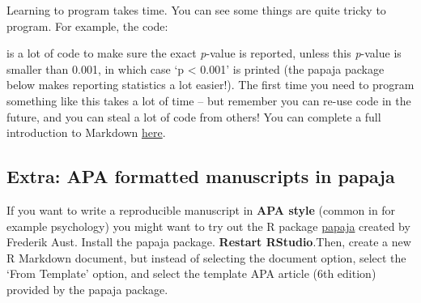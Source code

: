 \documentclass[
  oneside]{book}
\newenvironment{Shaded}{\begin{snugshade}}{\end{snugshade}}
\newcommand{\AttributeTok}[1]{\textcolor[rgb]{0.77,0.63,0.00}{#1}}
\newcommand{\DecValTok}[1]{\textcolor[rgb]{0.00,0.00,0.81}{#1}}
\newcommand{\FloatTok}[1]{\textcolor[rgb]{0.00,0.00,0.81}{#1}}
\newcommand{\FunctionTok}[1]{\textcolor[rgb]{0.00,0.00,0.00}{#1}}
\newcommand{\NormalTok}[1]{#1}
\newcommand{\SpecialCharTok}[1]{\textcolor[rgb]{0.00,0.00,0.00}{#1}}
\newcommand{\StringTok}[1]{\textcolor[rgb]{0.31,0.60,0.02}{#1}}
\begin{document}
Learning to program takes time. You can see some things are quite tricky to
program. For example, the code:

\begin{Shaded}
\end{Shaded}

is a lot of code to make sure the exact \emph{p}-value is reported, unless this
\emph{p}-value is smaller than 0.001, in which case `p \textless{} 0.001' is printed (the papaja
package below makes reporting statistics a lot easier!). The first time you need
to program something like this takes a lot of time -- but remember you can re-use
code in the future, and you can steal a lot of code from others! You can
complete a full introduction to Markdown
\href{https://rmarkdown.rstudio.com/articles_intro.html}{here}.

\hypertarget{extra-apa-formatted-manuscripts-in-papaja}{%
\subsection{Extra: APA formatted manuscripts in papaja}\label{extra-apa-formatted-manuscripts-in-papaja}}

If you want to write a reproducible manuscript in \textbf{APA style} (common in for
example psychology) you might want to try out the R package
\href{https://github.com/crsh/papaja}{papaja} created by Frederik Aust. Install the
papaja package. \textbf{Restart RStudio}.Then, create a new R Markdown document, but
instead of selecting the document option, select the `From Template' option, and
select the template APA article (6th edition) provided by the papaja package.
\end{document}
